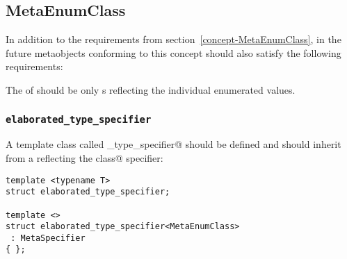 \subsection{MetaEnumClass}

In addition to the requirements from section~\ref{concept-MetaEnumClass},
in the future metaobjects conforming to this concept should also
satisfy the following requirements:

The \verb@members@ of  should be only  s
reflecting the individual enumerated values.

\subsubsection{\texttt{elaborated\_type\_specifier}}

A template class called \verb@elaborated_type_specifier@ should be defined and should inherit from
a  reflecting the \verb@enum class@ specifier:

\begin{verbatim}
template <typename T>
struct elaborated_type_specifier;

template <>
struct elaborated_type_specifier<MetaEnumClass>
 : MetaSpecifier
{ };
\end{verbatim}
